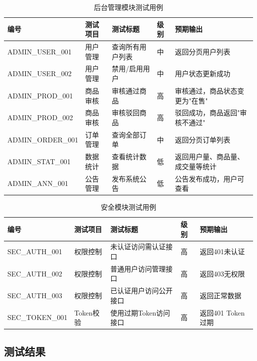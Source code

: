 \documentclass[12pt,a4paper,oneside]{ctexart}
\begin{document}
\begin{table}[htbp]
\centering
\caption{后台管理模块测试用例}
\label{tab:test-admin}
\renewcommand{\arraystretch}{1.1}
\scriptsize
\setlength{\tabcolsep}{3pt}
\begin{tabular}{|p{3.1cm}|p{1.0cm}|p{2.2cm}|p{0.6cm}|p{7.5cm}|}
\hline
\textbf{编号} & \textbf{测试项目} & \textbf{测试标题} & \textbf{级别} & \textbf{预期输出} \\
\hline
ADMIN\_USER\_001 & 用户管理 & 查询所有用户列表 & 中 & 返回分页用户列表 \\
\hline
ADMIN\_USER\_002 & 用户管理 & 禁用/启用用户 & 中 & 用户状态更新成功 \\
\hline
ADMIN\_PROD\_001 & 商品审核 & 审核通过商品 & 高 & 审核通过，商品状态变更为"在售" \\
\hline
ADMIN\_PROD\_002 & 商品审核 & 审核驳回商品 & 高 & 驳回成功，商品返回"审核不通过" \\
\hline
ADMIN\_ORDER\_001 & 订单管理 & 查询全部订单 & 中 & 返回分页订单列表 \\
\hline
ADMIN\_STAT\_001 & 数据统计 & 查看统计数据 & 低 & 返回用户量、商品量、成交量等统计 \\
\hline
ADMIN\_ANN\_001 & 公告管理 & 发布系统公告 & 低 & 公告发布成功，用户可查看 \\
\hline
\hline
\end{tabular}
\end{table}

\begin{table}[htbp]
\centering
\caption{安全模块测试用例}
\label{tab:test-security}
\renewcommand{\arraystretch}{1.1}
\scriptsize
\setlength{\tabcolsep}{3pt}
\begin{tabular}{|p{3.1cm}|p{1.0cm}|p{2.2cm}|p{0.6cm}|p{7.5cm}|}
\hline
\textbf{编号} & \textbf{测试项目} & \textbf{测试标题} & \textbf{级别} & \textbf{预期输出} \\
\hline
SEC\_AUTH\_001 & 权限控制 & 未认证访问需认证接口 & 高 & 返回401未认证 \\
\hline
SEC\_AUTH\_002 & 权限控制 & 普通用户访问管理接口 & 高 & 返回403无权限 \\
\hline
SEC\_AUTH\_003 & 权限控制 & 已认证用户访问公开接口 & 高 & 返回正常数据 \\
\hline
SEC\_TOKEN\_001 & Token校验 & 使用过期Token访问接口 & 高 & 返回401 Token过期 \\
\hline
\hline
\end{tabular}
\end{table}

\subsection{测试结果}
\end{document}
